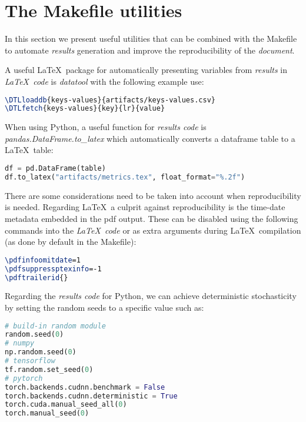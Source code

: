 \documentclass[journal]{IEEEtran}
\begin{document}
\section{The Makefile utilities}
In this section we present useful utilities that can be combined with the Makefile to automate \textit{results} generation and improve the reproducibility of the \textit{document}.

A useful \LaTeX\ package for automatically presenting variables from \textit{results} in \textit{\LaTeX\ code} is \textit{datatool} with the following example use:
\begin{lstlisting}[language=TeX, style=lststyle, caption={\LaTeX\ datatool example of loading a file that contains pairs of keys and values (artifacts/keys-values.csv) generated by a \textit{results code} and getting the value of a key named lr.}]
\DTLloaddb{keys-values}{artifacts/keys-values.csv}
\DTLfetch{keys-values}{key}{lr}{value}
\end{lstlisting}

When using Python, a useful function for \textit{results code} is \textit{pandas.DataFrame.to\_latex} which automatically converts a dataframe table to a \LaTeX\ table:
\begin{lstlisting}[language=python, style=lststyle, caption={Convert Pandas DataFrame (df) to \LaTeX\ table (artifacts/metrics.tex) in \textit{results code}.}]
df = pd.DataFrame(table)
df.to_latex("artifacts/metrics.tex", float_format="%.2f")
\end{lstlisting}

There are some considerations need to be taken into account when reproducibility is needed.
Regarding \LaTeX\, a culprit against reproducibility is the time-date metadata embedded in the pdf output.
These can be disabled using the following commands into the \textit{\LaTeX\ code} or as extra arguments during \LaTeX\ compilation (as done by default in the Makefile):
\begin{lstlisting}[language=TeX, style=lststyle, caption={\LaTeX\ pdf reproducibility commands.}]
\pdfinfoomitdate=1
\pdfsuppressptexinfo=-1
\pdftrailerid{}
\end{lstlisting}

Regarding the \textit{results code} for Python, we can achieve deterministic stochasticity by setting the random seeds to a specific value such as:
\begin{lstlisting}[language=python, style=lststyle, caption={Python reproducibility commands for popular libraries.}]
# build-in random module
random.seed(0)
# numpy
np.random.seed(0)
# tensorflow
tf.random.set_seed(0)
# pytorch
torch.backends.cudnn.benchmark = False
torch.backends.cudnn.deterministic = True
torch.cuda.manual_seed_all(0)
torch.manual_seed(0)
\end{lstlisting}
\end{document}
